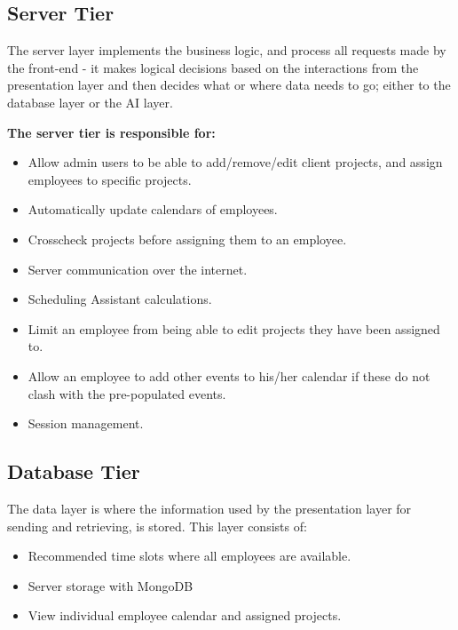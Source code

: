\documentclass[a4paper,12pt]{article}
\begin{document}
\begin{adjustwidth}{2.5em}{0pt}
		\subsection{Server Tier}
		\begin{flushleft}
			The server layer implements the business logic, and process all requests made by the front-end - it makes logical decisions based on the interactions from the presentation layer and then decides what or where data needs to go; either to the database layer or the AI layer.
			\newline
			
			\textbf{The server tier is responsible for:}
			\begin{itemize}
				\item Allow admin users to be able to add/remove/edit client projects, and assign employees to specific projects.
				\item Automatically update calendars of employees.
				\item Crosscheck projects before assigning them to an employee.
				\item Server communication over the internet.
				\item Scheduling Assistant calculations. 
				\item Limit an employee from being able to edit projects they have been assigned to.
				\item Allow an employee to add other events to his/her calendar if these do not clash with the pre-populated events.
				\item Session management.
			\end{itemize}
		\end{flushleft}
		
		\newpage
		\subsection{Database Tier}
		\begin{flushleft}
			The data layer is where the information used by the presentation layer for sending and retrieving, is stored. This layer consists of:
			\begin{itemize}
				\item Recommended time slots where all employees are available. 
				\item Server storage with MongoDB
				\item View individual employee calendar and assigned projects. 
			\end{itemize}
		\end{flushleft}
		

\end{adjustwidth}
\end{document}
